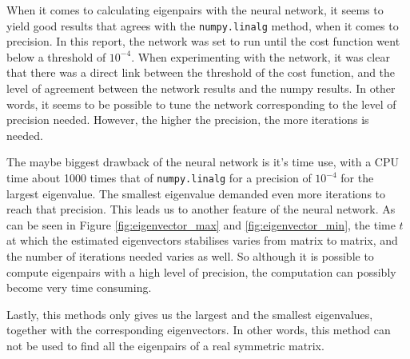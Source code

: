 When it comes to calculating eigenpairs with the neural network, it seems to yield good results that agrees with the \texttt{numpy.linalg} method, when it comes to precision. In this report, the network was set to run until the cost function went below a threshold of $10^{-4}$. When experimenting with the network, it was clear that there was a direct link between the threshold of the cost function, and the level of agreement between the network results and the numpy results. In other words, it seems to be possible to tune the network corresponding to the level of precision needed. However, the higher the precision, the more iterations is needed.

The maybe biggest drawback of the neural network is it's time use, with a CPU time about 1000 times that of \texttt{numpy.linalg} for a precision of $10^{-4}$ for the largest eigenvalue. The smallest eigenvalue demanded even more iterations to reach that precision. This leads us to another feature of the neural network. As can be seen in Figure \ref{fig:eigenvector_max} and \ref{fig:eigenvector_min}, the time $t$ at which the estimated eigenvectors stabilises varies from matrix to matrix, and the number of iterations needed varies as well. So although it is possible to compute eigenpairs with a high level of precision, the computation can possibly become very time consuming.

Lastly, this methods only gives us the largest and the smallest eigenvalues, together with the corresponding eigenvectors. In other words, this method can not be used to find all the eigenpairs of a real symmetric matrix.
